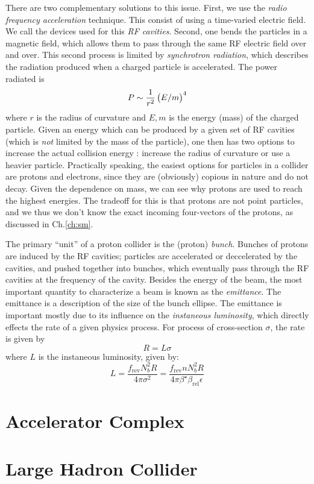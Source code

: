 There are two complementary solutions to this issue.
First, we use the \textit{radio frequency acceleration} technique.
This consist of using a time-varied electric field.
We call the devices used for this \textit{RF cavities}.
Second, one bends the particles in a magnetic field, which allows them to pass through the same RF electric field over and over.
This second process is limited by \textit{synchrotron radiation}, which describes the radiation produced when a charged particle is accelerated.
The power radiated is
\begin{equation}
P \sim \frac{1}{r^2} \begin{pmatrix} E/m \end{pmatrix}^4
\end{equation}
where $r$ is the radius of curvature and $E,m$ is the energy (mass) of the charged particle.
Given an energy which can be produced by a given set of RF cavities (which is \textit{not} limited by the mass of the particle), one then has two options to increase the actual collision energy : increase the radius of curvature or use a heavier particle.
Practically speaking, the easiest options for particles in a collider are protons and electrons, since they are (obviously) copious in nature and do not decay\footnotemark.
Given the dependence on mass, we can see why protons are used to reach the highest energies.
The tradeoff for this is that protons are not point particles, and we thus we don't know the exact incoming four-vectors of the protons, as discussed in Ch.\ref{ch:sm}.

The primary ``unit'' of a proton collider is the (proton) \textit{bunch}.
Bunches of protons are induced by the RF cavities; particles are accelerated or deccelerated by the cavities, and pushed together into bunches, which eventually pass through the RF cavities at the frequency of the cavity.
Besides the energy of the beam, the most important quantity to characterize a beam is known as the \textit{emittance}. 
The emittance is a description of the size of the bunch ellipse.
The emittance is important mostly due to its influence on the \textit{instaneous luminosity}, which directly effects the rate of a given physics process.
For process of cross-section $\sigma$, the rate is given by
\begin{equation}
R = L \sigma
\end{equation}
where $L$ is the instaneous luminosity, given by:
\begin{equation}
L = \frac{f_{\text{rev}} N_b^2 R}{4 \pi \sigma^2}= \frac{f_{\text{rev}} n N_b^2 R }{4 \pi \beta^\star \beta_{\text{rel}} \epsilon}
\end{equation}

\section{Accelerator Complex}

\section{Large Hadron Collider}
